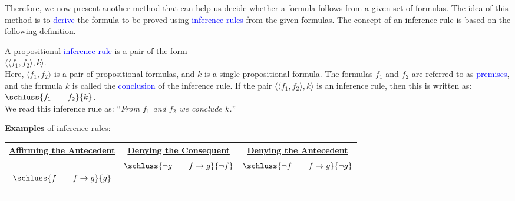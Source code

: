 Therefore, we now present another method that can help us decide
whether a formula follows from a given set of formulas. The idea of this method
is to \textcolor{blue}{derive} the formula to be proved using \textcolor{blue}{inference rules} from the
given formulas. The concept of an inference rule is based on the following definition. 
\begin{Definition} \hspace*{\fill} \linebreak
    A propositional \textcolor{blue}{inference rule} is a pair of the form  
    \\[0.2cm]
    \hspace*{1.3cm}
    $\bigl\langle \langle f_1, f_2 \rangle, k \bigr\rangle$.    
    \\[0.2cm]
    Here, $\langle f_1, f_2 \rangle$ is a pair of propositional formulas, and $k$ is a
    single propositional formula.   The formulas $f_1$ and $f_2$ are referred to as
    \textcolor{blue}{premises}, and the formula $k$ is called the \textcolor{blue}{conclusion} of the inference
    rule. If the pair $\bigl\langle \langle f_1, f_2 \rangle, k \bigr\rangle$ is an inference rule, then this is written as: 
    \\[0.3cm]
    \hspace*{1.3cm}      
    $\schluss{f_1 \qquad f_2}{k}$.
    \\[0.3cm]
    We read this inference rule as: 
    ``\textsl{From $f_1$ and $f_2$ we  conclude $k$.}''
    \eox
\end{Definition}

\noindent
\textbf{Examples} of inference rules:
\\[0.2cm]
\hspace*{1.3cm}            
\begin{tabular}[t]{|c|c|c|}
\hline
\rule{0pt}{15pt} \href{https://en.wikipedia.org/wiki/Modus_ponens}{Affirming the Antecedent} & 
 \href{https://en.wikipedia.org/wiki/Modus_tollens}{Denying the Consequent} &
 \href{https://en.wikipedia.org/wiki/Denying_the_antecedent}{Denying the Antecedent} \\[0.3cm]
\hline
$
\rule[-15pt]{0pt}{40pt}\schluss{f \quad\quad f \rightarrow g}{g}$ &
$\schluss{\neg g \quad\quad f \rightarrow g}{\neg f}$ &
$\schluss{\neg f \quad\quad f \rightarrow g}{\neg g}$ \\[0.3cm]
\hline
\end{tabular}
\\[0.3cm]

